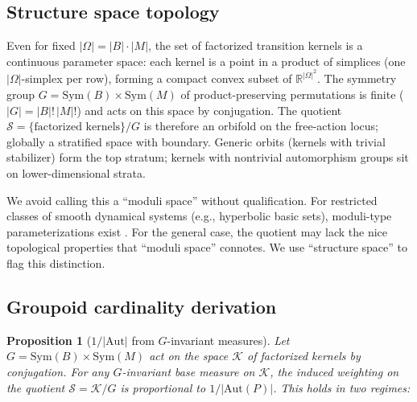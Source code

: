 \documentclass[12pt]{article}
\newtheorem{proposition}[theorem]{Proposition}
\theoremstyle{remark}
\newcommand{\Aut}{\mathrm{Aut}}
\newcommand{\Sym}{\mathrm{Sym}}
\begin{document}
\subsection{Structure space topology}\label{app:topology}

Even for fixed $|\Omega| = |B| \cdot |M|$, the set of factorized transition kernels is a continuous parameter space: each kernel is a point in a product of simplices (one $|\Omega|$-simplex per row), forming a compact convex subset of $\mathbb{R}^{|\Omega|^2}$. The symmetry group $G = \Sym(B) \times \Sym(M)$ of product-preserving permutations is finite ($|G| = |B|!\,|M|!$) and acts on this space by conjugation. The quotient $\mathcal{S} = \{\text{factorized kernels}\}/G$ is therefore an orbifold on the free-action locus; globally a stratified space with boundary. Generic orbits (kernels with trivial stabilizer) form the top stratum; kernels with nontrivial automorphism groups sit on lower-dimensional strata.

We avoid calling this a ``moduli space'' without qualification. For restricted classes of smooth dynamical systems (e.g., hyperbolic basic sets), moduli-type parameterizations exist \cite{pinto-rand2006}. For the general case, the quotient may lack the nice topological properties that ``moduli space'' connotes. We use ``structure space'' to flag this distinction.

\subsection{Groupoid cardinality derivation}\label{app:groupoid}

\begin{proposition}[$1/|\Aut|$ from $G$-invariant measures]\label{prop:aut-app}
Let $G = \Sym(B) \times \Sym(M)$ act on the space $\mathcal{K}$ of factorized kernels by conjugation. For any $G$-invariant base measure on $\mathcal{K}$, the induced weighting on the quotient $\mathcal{S} = \mathcal{K}/G$ is proportional to $1/|\Aut(P)|$. This holds in two regimes:
\end{proposition}
\end{document}
